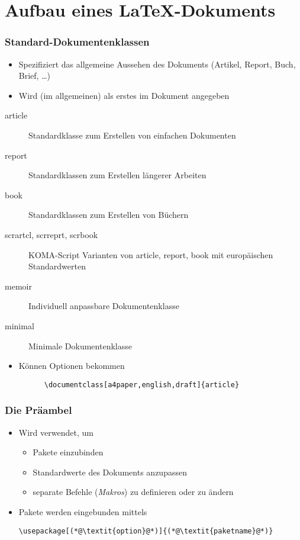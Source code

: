 
\subtitle{Einführung}
\date{Sommersemester 2017}


\section{Aufbau eines \LaTeX-Dokuments}

\begin{frame}[fragile]
  \frametitle{Standard-Dokumentenklassen}
  \begin{itemize}
    \item Spezifiziert das allgemeine Aussehen des Dokuments (Artikel, Report, Buch,
    Brief, \dots)
    \item Wird (im allgemeinen) als erstes im Dokument angegeben
  \end{itemize}  
  \begin{description}
    \item[article] Standardklasse zum Erstellen von einfachen Dokumenten
    \item[report] Standardklassen zum Erstellen längerer Arbeiten
    \item[book] Standardklassen zum Erstellen von Büchern
    \item[scrartcl, scrreprt, scrbook] KOMA-Script Varianten von article, report, book mit
      europäischen Standardwerten
    \item[memoir] Individuell anpassbare Dokumentenklasse
    \item[minimal] Minimale Dokumentenklasse
  \end{description}
  \begin{itemize}
    \item<+-> Können Optionen bekommen
    \begin{lstlisting}
      \documentclass[a4paper,english,draft]{article}
    \end{lstlisting}
  \end{itemize}
\end{frame}

\begin{frame}[fragile]
  \frametitle{Die Präambel}

  \begin{itemize}
  \item<1-> Wird verwendet, um
    \begin{itemize}
    \item<2-> Pakete einzubinden
    \item<3-> Standardwerte des Dokuments anzupassen
    \item<4-> separate Befehle (\emph{Makros}) zu definieren oder zu ändern
    \end{itemize}
  \item<2-> Pakete werden eingebunden mittels
\begin{lstlisting}
\usepackage[(*@\textit{option}@*)]{(*@\textit{paketname}@*)}
\end{lstlisting}
  \end{itemize}

\end{frame}

